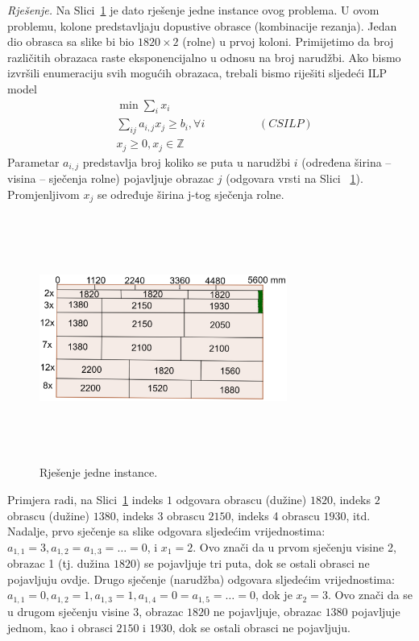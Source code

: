 \documentclass[b5paper, utf8, 11pt, colorlinks]{book}
\theoremstyle{definition}
\begin{document}
 \emph{Rješenje.} Na Slici~\ref{fig:cuting_stock_solutions} je dato rješenje jedne instance ovog problema. 
 U ovom problemu, kolone predstavljaju dopustive obrasce (kombinacije rezanja). Jedan dio obrasca sa slike bi bio $1820\times 2$ (rolne) u prvoj koloni.
 Primijetimo da broj različitih obrazaca raste eksponencijalno u odnosu na broj narudžbi.  Ako bismo izvršili enumeraciju svih mogućih obrazaca, trebali bismo riješiti sljedeći ILP model
 \begin{align*}
      & \min \sum_{i} x_i \\
      & \sum_{ij} a_{i,j }x_j \geq b_i, \forall i \hspace{2cm} (CSILP)\\
      &  x_j \geq 0, x_{j} \in \mathbb{Z} 
 \end{align*}
 Parametar $a_{i,j}$ predstavlja broj  koliko se puta u narudžbi $i$ (određena širina -- visina --  sječenja rolne) pojavljuje obrazac $j$ (odgovara vrsti na Slici ~\ref{fig:cuting_stock_solutions}). Promjenljivom $x_j$ se određuje širina j-tog sječenja rolne. 
 
   \begin{figure}[!hbt]
 	\centering
 	\includegraphics[width=230pt, height=230pt]{cutting_stock.eps}
 	\caption{Rješenje jedne instance.}
 	\label{fig:cuting_stock_solutions}
 \end{figure}
 
 Primjera radi, na  Slici~\ref{fig:cuting_stock_solutions} indeks $1$ odgovara obrascu (dužine) $1820$, indeks $2$ obrascu (dužine) $1380$, indeks 3 obrascu $2150$, indeks 4 obrascu $1930$,   itd.  Nadalje, prvo sječenje sa slike odgovara 
 sljedećim vrijednostima: $a_{1,1}=3, a_{1,2}=a_{1,3}=\ldots =0$, i $x_1 = 2$. Ovo znači da u prvom sječenju visine 2, obrazac 1 (tj. dužina $1820$) se pojavljuje tri puta, dok se ostali obrasci ne pojavljuju ovdje. Drugo sječenje (narudžba) odgovara sljedećim vrijednostima: $a_{1,1}= 0, a_{1,2}=1, a_{1,3}=1, a_{1,4}=0=a_{1,5}=\ldots = 0$, dok je  $x_2 = 3$. Ovo znači da se u drugom sječenju visine 3, obrazac $1820$ ne pojavljuje, obrazac $1380$ pojavljuje jednom, kao i obrasci $2150$  i $1930$, dok se ostali obrasci ne pojavljuju.  
\end{document}
